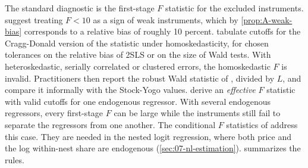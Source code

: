 The standard diagnostic is the first-stage $F$ statistic for the excluded instruments.
\citet{StaigerStock1997} suggest treating $F < 10$ as a sign of weak instruments, which by
\cref{prop:A-weak-bias} corresponds to a relative bias of roughly 10 percent. \citet{StockYogo2005} tabulate
cutoffs for the Cragg-Donald version of the statistic under homoskedasticity, for chosen tolerances on
the relative bias of 2SLS or on the size of Wald tests. With heteroskedastic, serially correlated or
clustered errors, the homoskedastic $F$ is invalid. Practitioners then report the robust Wald statistic of
\citet{KleibergenPaap2006}, divided by $L$, and compare it informally with the Stock-Yogo values.
\citet{MontielOleaPflueger2013} derive an \emph{effective} $F$ statistic with valid cutoffs for one
endogenous regressor. With several endogenous regressors, every first-stage $F$ can be large while the
instruments still fail to separate the regressors from one another. The conditional $F$ statistics of
\citet{SandersonWindmeijer2016} address this case. They are needed in the nested logit regression, where both
price and the log within-nest share are endogenous (\cref{sec:07-nl-estimation}). 
summarizes the rules.

